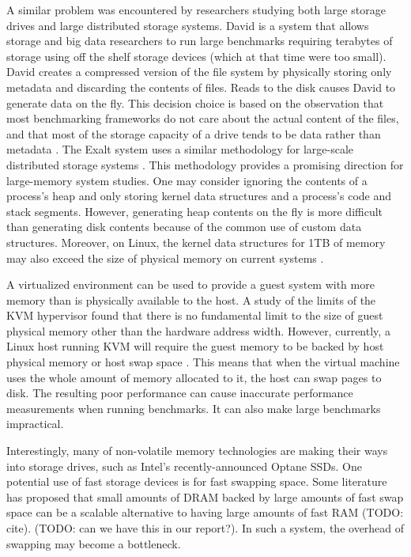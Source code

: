 \documentclass[twocolumn,11pt]{article}
\begin{document}
A similar problem was encountered by researchers studying both large storage
drives and large distributed storage systems. David is a system that allows
storage and big data researchers to run large benchmarks requiring terabytes of
storage using off the shelf storage devices (which at that time were too small).
David creates a compressed version of the file system by physically storing only
metadata and discarding the contents of files. Reads to the disk causes David to
generate data on the fly. This decision choice is based on the observation that
most benchmarking frameworks do not care about the actual content of the files,
and that most of the storage capacity of a drive tends to be data rather than
metadata \cite{david}. The Exalt system uses a similar methodology for
large-scale distributed storage systems \cite{exalt}. This methodology provides
a promising direction for large-memory system studies. One may consider ignoring
the contents of a process’s heap and only storing kernel data structures and a
process’s code and stack segments. However, generating heap contents on the fly
is more difficult than generating disk contents because of the common use of
custom data structures. Moreover, on Linux, the kernel data structures for 1TB
of memory may also exceed the size of physical memory on current systems
\cite{simics}.

A virtualized environment can be used to provide a guest system with more memory
than is physically available to the host. A study of the limits of the KVM
hypervisor found that there is no fundamental limit to the size of guest
physical memory other than the hardware address width. However, currently, a
Linux host running KVM will require the guest memory to be backed by host
physical memory or host swap space \cite{ibmkvm}.  This means that when the
virtual machine uses the whole amount of memory allocated to it, the host can
swap pages to disk. The resulting poor performance can cause inaccurate
performance measurements when running benchmarks. It can also make large
benchmarks impractical.

Interestingly, many of non-volatile memory technologies are making their ways
into storage drives, such as Intel's recently-announced Optane SSDs. One
potential use of fast storage devices is for fast swapping space. Some
literature has proposed that small amounts of DRAM backed by large amounts of
fast swap space can be a scalable alternative to having large amounts of fast
RAM (TODO: cite). (TODO: can we have this in our report?). In such a system,
the overhead of swapping may become a bottleneck.
\end{document}
